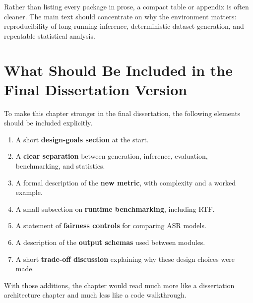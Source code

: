 Rather than listing every package in prose, a compact table or appendix is often cleaner. The main text should concentrate on why the environment matters: reproducibility of long-running inference, deterministic dataset generation, and repeatable statistical analysis.

\section{What Should Be Included in the Final Dissertation Version}
To make this chapter stronger in the final dissertation, the following elements should be included explicitly.

\begin{enumerate}
    \item A short \textbf{design-goals section} at the start.
    \item A \textbf{clear separation} between generation, inference, evaluation, benchmarking, and statistics.
    \item A formal description of the \textbf{new metric}, with complexity and a worked example.
    \item A small subsection on \textbf{runtime benchmarking}, including RTF.
    \item A statement of \textbf{fairness controls} for comparing ASR models.
    \item A description of the \textbf{output schemas} used between modules.
    \item A short \textbf{trade-off discussion} explaining why these design choices were made.
\end{enumerate}

With those additions, the chapter would read much more like a dissertation architecture chapter and much less like a code walkthrough.

